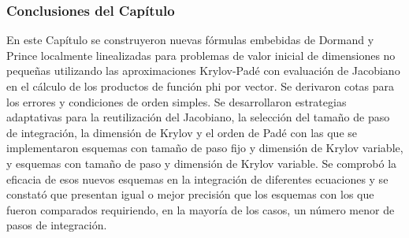 \subsubsection{Conclusiones del Capítulo}
En este Capítulo se construyeron nuevas fórmulas embebidas de Dormand y Prince localmente linealizadas para problemas de valor inicial de dimensiones no pequeñas utilizando las aproximaciones Krylov-Padé
con evaluación de Jacobiano en el cálculo de los productos de función phi por vector. Se derivaron cotas para los errores y condiciones de orden simples. Se desarrollaron estrategias adaptativas para la reutilización del Jacobiano, la selección del tamaño de paso de integración, la dimensión de Krylov y el orden de Padé con las que se implementaron esquemas con tamaño de paso fijo y dimensión
de Krylov variable, y esquemas con tamaño de paso y dimensión de Krylov variable. Se comprobó la eficacia de esos nuevos esquemas en la integración de diferentes ecuaciones y se constató que presentan igual o mejor precisión que los esquemas con los que fueron comparados requiriendo, en la mayoría de los casos, un número menor de pasos de integración.

%
%
